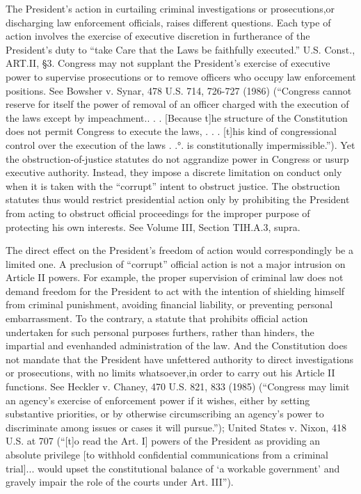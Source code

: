 The President’s action in curtailing criminal investigations or prosecutions,or discharging law enforcement officials, raises different questions. 
Each type of action involves the exercise of executive discretion in furtherance of the President’s duty to “take Care that the Laws be faithfully executed.” U.S. Const., ART.II, \S 3. 
Congress may not supplant the President’s exercise of executive power to supervise prosecutions or to remove officers who occupy law enforcement positions. 
See Bowsher v. Synar, 478 U.S. 714, 726-727 (1986) (“Congress cannot reserve for itself the power of removal of an officer charged with the execution of the laws except by impeachment.. . . [Because t]he structure of the Constitution does not permit Congress to execute the laws, . . . [t]his kind of congressional control over the execution of the laws . .°. is constitutionally impermissible.”). 
Yet the obstruction-of-justice statutes do not aggrandize power in Congress or usurp executive authority. 
Instead, they impose a discrete limitation on conduct only when it is taken with the “corrupt” intent to obstruct justice. 
The obstruction statutes thus would restrict presidential action only by prohibiting the President from acting to obstruct official proceedings for the improper purpose of protecting his own interests. 
See Volume III, Section TIH.A.3, supra. 

The direct effect on the President’s freedom of action would correspondingly be a limited one. 
A preclusion of “corrupt” official action is not a major intrusion on Article II powers. 
For example, the proper supervision of criminal law does not demand freedom for the President to act with the intention of shielding himself from criminal punishment, avoiding financial liability, or preventing personal embarrassment. 
To the contrary, a statute that prohibits official action undertaken for such personal purposes furthers, rather than hinders, the impartial and evenhanded administration of the law. 
And the Constitution does not mandate that the President have unfettered authority to direct investigations or prosecutions, with no limits whatsoever,in order to carry out his Article II functions. 
See Heckler v. Chaney, 470 U.S. 821, 833 (1985) (“Congress may limit an agency’s exercise of enforcement power if it wishes, either by setting substantive priorities, or by otherwise circumscribing an agency’s power to discriminate among issues or cases it will pursue.”); 
United States v. Nixon, 418 U.S. at 707 (“[t]o read the Art. I] powers of the President as providing an absolute privilege [to withhold confidential communications from a criminal trial]... would upset the constitutional balance of ‘a workable government’ and gravely impair the role of the courts under Art. III”). 

